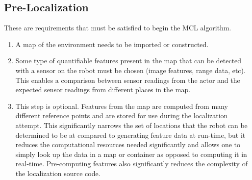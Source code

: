 \documentclass[a4paper,11pt]{article}
\begin{document}
\subsection{Pre-Localization}
 These are requirements that must be satisfied to begin the MCL algorithm.
  \begin{enumerate}
  \item A map of the environment needs to be imported or constructed. 
  \item Some type of quantifiable features present in the map that can be detected with a sensor on the robot must be chosen (image features, range data, etc). This enables a comparison between sensor readings from the actor and the expected sensor readings from different places in the map.
  \item This step is optional.  Features from the map are computed from many different reference points and are stored for use during the localization attempt. This significantly narrows the set of locations that the robot can be determined to be at compared to generating feature data at run-time, but it reduces the computational resources needed significantly and allows one to simply look up the data in a map or container as opposed to computing it in real-time. Pre-computing features also significantly reduces the complexity of the localization source code.
  \end{enumerate}
\end{document}

